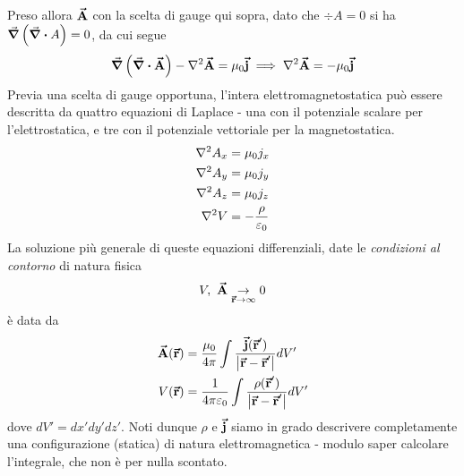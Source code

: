 Preso allora $\vb*{\va{A}}$ con la scelta di gauge qui sopra, dato che $\div{A}=0$ si ha $\grad{\left(\div{A}\right)}=0$, da cui segue
\begin{equation*}
	\grad \left( \div{\vba{A}}\right) - \laplacian{\vba{A}}=\mu_0 \vba j\implies \laplacian{\vba{A}}=-\mu_0 \vba j
\end{equation*}
Previa una scelta di gauge opportuna, l'intera elettromagnetostatica può essere descritta da quattro equazioni di Laplace - una con il potenziale scalare per l'elettrostatica, e tre con il potenziale vettoriale per la magnetostatica.
\begin{align}
	\laplacian A_x&=\mu_0 j_x\\
	\laplacian A_y&=\mu_0 j_y\\
	\laplacian A_z&=\mu_0 j_z\\
	\laplacian V&=-\frac{\rho}{\epsilon_0}
\end{align}
La soluzione più generale di queste equazioni differenziali, date le \textit{condizioni al contorno} di natura fisica
\begin{equation*}
	V,\ \vba{A}\underset{\vba{r}\to\infty}{\to}0
\end{equation*}
è data da
\begin{align}
	\vb*{\va{A}}(\vb*{\va{r}})&=\frac{\mu_0}{4\pi}\int\frac{\vb*{\va{j}}(\vb*{\va{r}}')}{\abs{\vb*{\va{r}}-\vb*{\va{r}}'}} dV'\\
	V(\vb*{\va{r}})&=\frac{1}{4\pi\varepsilon_0}\int \frac{\rho(\vb*{\va{r}}')}{\abs{\vb*{\va{r}}-\vb*{\va{r}}'}}dV'
\end{align}
dove $dV'=dx'dy'dz'$.
Noti dunque $\rho$ e $\vb*{\va{j}}$ siamo in grado descrivere completamente una configurazione (statica) di natura elettromagnetica - modulo saper calcolare l'integrale, che non è per nulla scontato.
